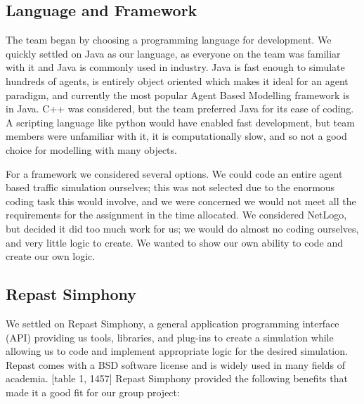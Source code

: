 \documentclass[11pt]{article}
\begin{document}
\subsection{Language and Framework}

The team began by choosing a programming language for development. We quickly settled on Java as our language, as everyone on the team was familiar with it and Java is commonly used in industry. Java is fast enough to simulate hundreds of agents, is entirely object oriented which makes it ideal for an agent paradigm, and currently the most popular Agent Based Modelling framework is in Java. C++ was considered, but the team preferred Java for its ease of coding. A scripting language like python would have enabled fast development, but team members were unfamiliar with it, it is computationally slow, and so not a good choice for modelling with many objects.

For a framework we considered several options. We could code an entire agent based traffic simulation ourselves; this was not selected due to the enormous coding task this would involve, and we were concerned we would not meet all the requirements for the assignment in the time allocated. We considered NetLogo, but decided it did too much work for us; we would do almost no coding ourselves, and very little logic to create. We wanted to show our own ability to code and create our own logic.


\subsection{Repast Simphony}

We settled on Repast Simphony, a general application programming interface (API) providing us tools, libraries, and plug-ins to create a simulation while allowing us to code and implement appropriate logic for the desired simulation. Repast comes with a BSD software license and is widely used in many fields of academia.\cite{5e} [table 1, 1457] Repast Simphony provided the following benefits that made it a good fit for our group project:
\end{document}
